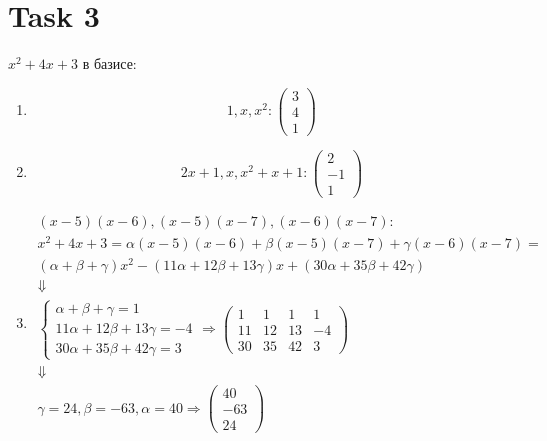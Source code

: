 \section{Task 3}
$x^2 + 4x + 3$ в базисе:
\begin{enumerate}
    \item
    \begin{equation}
        1, x, x^2 :
        \begin{pmatrix}
            3 \\ 4 \\ 1
        \end{pmatrix}
    \end{equation}
    \item
    \begin{equation}
        2x+1, x, x^2+x+1 :
        \begin{pmatrix}
            2 \\ -1 \\ 1
        \end{pmatrix}
    \end{equation}
    \item
    \begin{gather}
        (x-5)(x-6), (x-5)(x-7), (x-6)(x-7) : \\
        x^2 + 4x + 3 = \alpha(x-5)(x-6) + \beta(x-5)(x-7) + \gamma(x-6)(x-7) = \\
        (\alpha + \beta + \gamma) x^2 - (11\alpha + 12\beta + 13\gamma)x + (30\alpha + 35\beta + 42\gamma) \\
        \Downarrow \\
        \begin{cases}
            \alpha + \beta + \gamma = 1 \\
            11\alpha + 12\beta + 13\gamma = -4 \\
            30\alpha + 35\beta + 42\gamma = 3
        \end{cases} \Longrightarrow
        \left(
        \begin{array}{ccc|c}
             1 &  1 &  1 &  1 \\
            11 & 12 & 13 & -4 \\
            30 & 35 & 42 &  3 
        \end{array}\right) \\
        \Downarrow \\
        \gamma = 24, \beta = -63, \alpha = 40 \Longrightarrow
        \begin{pmatrix}
            40 \\
            -63 \\
            24
        \end{pmatrix}
    \end{gather}

\end{enumerate}